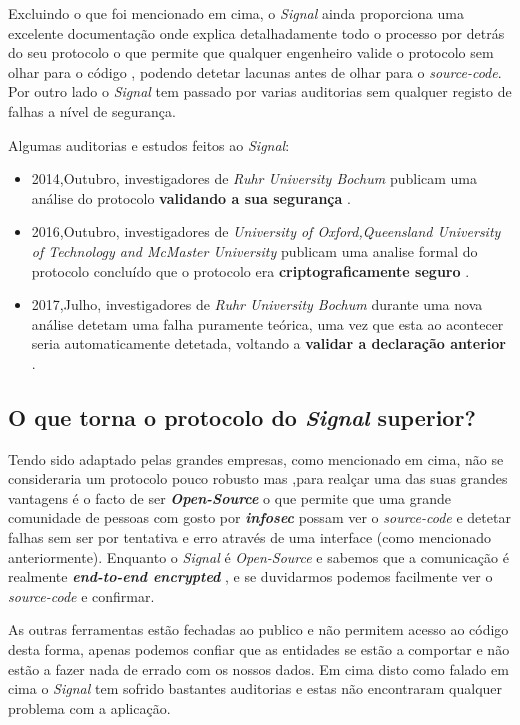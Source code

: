 Excluindo o que foi mencionado em cima, o \textit{Signal} ainda proporciona uma excelente documentação \cite{signal} onde explica detalhadamente todo o processo por detrás do seu protocolo o que permite que qualquer engenheiro valide o protocolo sem olhar para o código , podendo detetar lacunas antes de olhar para o \textit{source-code}.
Por outro lado o \textit{Signal} tem passado por varias auditorias sem qualquer registo de falhas a nível de segurança.

Algumas auditorias e estudos feitos ao \textit{Signal}:
\begin{itemize}
    \item 2014,Outubro, investigadores de \textit{Ruhr University Bochum} publicam uma análise do protocolo \textbf{validando a sua segurança} \cite{frosch2016secure}.
    \item 2016,Outubro, investigadores de \textit{University of Oxford,Queensland University of Technology and McMaster University} publicam uma analise formal do protocolo concluído que o protocolo era \textbf{criptograficamente seguro} \cite{cohn2017formal}.
    \item 2017,Julho, investigadores de \textit{Ruhr University Bochum} durante uma nova análise detetam uma falha puramente teórica, uma vez que esta ao acontecer seria automaticamente detetada, voltando a \textbf{validar a declaração anterior} \cite{rosler2018more}.
\end{itemize}

\subsection{O que torna o protocolo do \textit{Signal} superior?}
Tendo sido adaptado pelas grandes empresas, como mencionado em cima, não se consideraria um protocolo pouco robusto mas ,para realçar uma das suas grandes vantagens é o facto de ser \textbf{\textit{Open-Source}} o que permite que uma grande comunidade de pessoas com gosto por \textit{\textbf{infosec}} possam ver o \textit{source-code} e detetar falhas sem ser por tentativa e erro através de uma interface (como mencionado anteriormente). Enquanto o \textit{Signal} é \textit{Open-Source} e sabemos que a comunicação é realmente \textbf{\textit{end-to-end encrypted}} , e se duvidarmos podemos facilmente ver o \textit{source-code} e confirmar. 

As outras ferramentas estão fechadas ao publico e não permitem acesso ao código desta forma, apenas podemos confiar que as entidades se estão a comportar e não estão a fazer nada de errado com os nossos dados. Em cima disto como falado em cima o \textit{Signal} tem sofrido bastantes auditorias e estas não encontraram qualquer problema com a aplicação.

